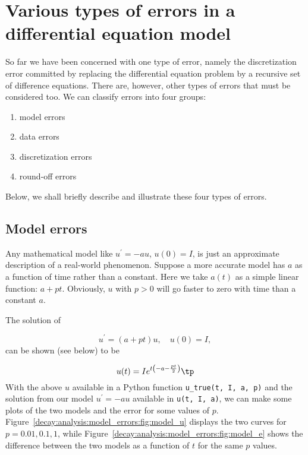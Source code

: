 \documentclass[graybox,sectrefs,envcountresetchap,open=right,final]{svmonodo}
\begin{document}
\section{Various types of errors in a differential equation model}

So far we have been concerned with one type of error, namely the
discretization error committed by replacing the differential equation
problem by a recursive set of difference equations. There are,
however, other types of errors that must be considered too. We can
classify errors into four groups:

\begin{enumerate}
\item model errors

\item data errors

\item discretization errors

\item round-off errors
\end{enumerate}

\noindent
Below, we shall briefly describe and illustrate these four types
of errors.

\subsection{Model errors}

Any mathematical model like $u^{\prime}=-au$, $u(0)=I$, is just an
approximate description of a real-world phenomenon. Suppose a more
accurate model has $a$ as a function of time rather than a
constant. Here we take $a(t)$ as a simple linear function: $a +
pt$. Obviously, $u$ with $p>0$ will go faster to zero with time than a
constant $a$.

The solution of

\[ u^{\prime} = (a + pt)u,\quad u(0)=I,\]
can be shown (see below) to be

\[ u(t) = I e^{t \left(- a - \frac{p t}{2}\right)}\tp\]
With the above $u$ available in a Python function \Verb!u_true(t, I, a, p)!
and the solution from our model $u^{\prime}=-au$ available in \texttt{u(t, I, a)},
we can make some plots of the two models and the error for some values
of $p$. Figure~\ref{decay:analysis:model_errors:fig:model_u} displays
the two curves for $p=0.01, 0.1, 1$, while Figure~\ref{decay:analysis:model_errors:fig:model_e} shows the difference
between the two models as a function of $t$ for the same $p$ values.
\end{document}

